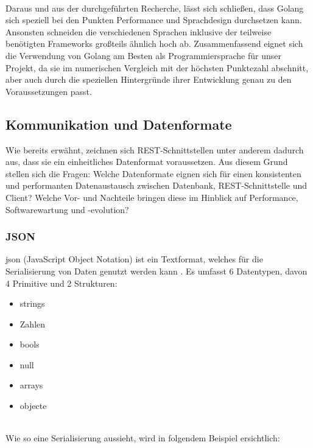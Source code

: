 		\label{tbl:comparison}~\\
		Daraus und aus der durchgeführten Recherche, lässt sich schließen, dass Golang sich speziell bei den Punkten Performance und Sprachdesign durchsetzen kann. Ansonsten schneiden die verschiedenen Sprachen inklusive der teilweise benötigten Frameworks großteils ähnlich hoch ab. Zusammenfassend eignet sich die Verwendung von Golang am Besten als Programmiersprache für unser Projekt, da sie im numerischen Vergleich mit der höchsten Punktezahl abschnitt, aber auch durch die speziellen Hintergründe ihrer Entwicklung genau zu den Voraussetzungen passt.
	\subsection{Kommunikation und Datenformate}
	Wie bereits erwähnt, zeichnen sich REST-Schnittstellen unter anderem dadurch aus, dass sie ein einheitliches Datenformat voraussetzen. Aus diesem Grund stellen sich die Fragen: Welche Datenformate eignen sich für einen konsistenten und performanten Datenaustausch zwischen Datenbank, REST-Schnittstelle und Client? Welche Vor- und Nachteile bringen diese im Hinblick auf Performance, Softwarewartung und -evolution?
	
	\newpage
	
		\subsubsection{JSON}
		\Gls{json} (JavaScript Object Notation) ist ein Textformat, welches für die Serialisierung von Daten genutzt werden kann \cite{rfc4627}. 
		Es umfasst 6 Datentypen, davon 4 Primitive und 2 Strukturen:
		\begin{itemize}
			\item \Gls{string}s
			\item Zahlen
			\item \Gls{bool}s
			\item \Gls{null}
			\item \Gls{array}s
			\item \Gls{object}e
		\end{itemize}
		\label{code:jsontypes}~\\	
		Wie so eine Serialisierung aussieht, wird in folgendem Beispiel ersichtlich: 
		
